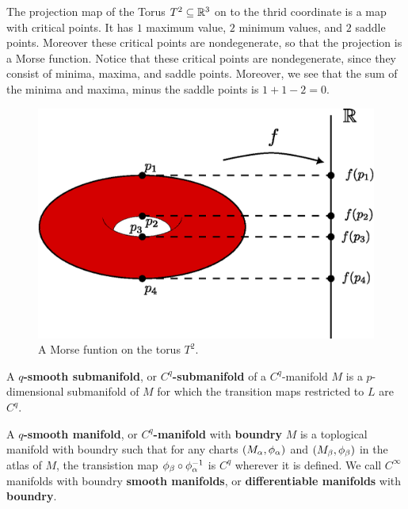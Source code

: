\begin{example}\label{1.8}
    The projection map of the Torus $T^2 \subseteq \mathbb{R}^3$ on to the thrid
    coordinate is a map with critical points. It has $1$ maximum value,  $2$
    minimum values, and  $2$ saddle points. Moreover these critical points are
    nondegenerate, so that the projection is a Morse function. Notice that these
    critical points are nondegenerate, since they consist of minima, maxima, and
    saddle points. Moreover, we see that the sum of the minima and maxima, minus
    the saddle points is $1+1-2=0$.
    \begin{figure}[h]
        \centering
        \includegraphics[scale=0.5]{Figures/Chapter1/morse_func_torus.eps}
        \caption{A Morse funtion on the torus $T^2$.}
        \label{figure_1.5}
    \end{figure}
\end{example}

\begin{definition}
    A \textbf{$q$-smooth submanifold}, or  \textbf{$C^q$-submanifold} of a
     $C^q$-manifold  $M$ is a  $p$-dimensional submanifold of $M$ for which the
     transition maps restricted to $L$ are  $C^q$.
\end{definition}

\begin{definition}
    A  \textbf{$q$-smooth manifold}, or \textbf{$C^q$-manifold} with
    \textbf{boundry} $M$ is a toplogical manifold with boundry such that for any
    charts $(M_\alpha,\phi_\alpha)$ and $(M_\beta,\phi_\beta)$ in the atlas of $M$, the
    transistion map  $\phi_\beta \circ \phi_\alpha^{-1}$ is $C^q$ wherever it is
    defined. We call $C^\infty$ manifolds with boundry  \textbf{smooth
    manifolds}, or \textbf{differentiable manifolds} with \textbf{boundry}.
\end{definition}

